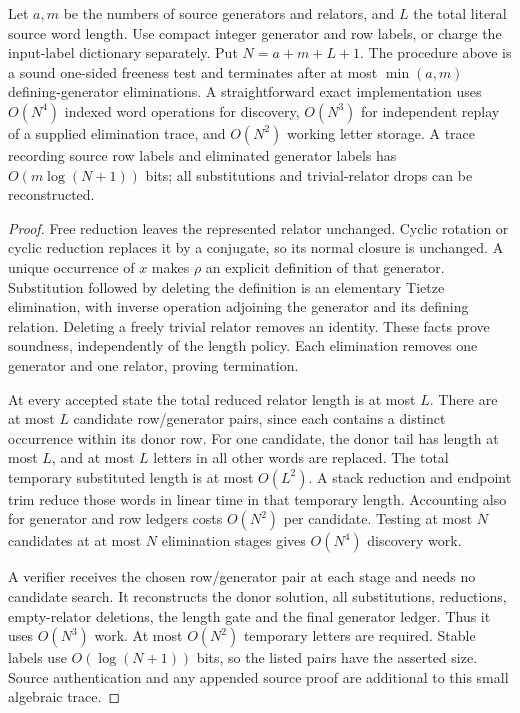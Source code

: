\begin{theorem}
\label{thm:bounded-tietze}
Let $a,m$ be the numbers of source generators and relators, and $L$ the
total literal source word length.  Use compact integer generator and row
labels, or charge the input-label dictionary separately.  Put
$N=a+m+L+1$.  The procedure above
is a sound one-sided freeness test and terminates after at most
$\min(a,m)$ defining-generator eliminations.  A straightforward exact
implementation uses $O(N^4)$ indexed word operations for discovery,
$O(N^3)$ for independent replay of a supplied elimination trace, and
$O(N^2)$ working letter storage.  A trace recording source row labels
and eliminated generator labels has $O(m\log(N+1))$ bits; all
substitutions and trivial-relator drops can be reconstructed.
\end{theorem}
\begin{proof}
Free reduction leaves the represented relator unchanged.  Cyclic rotation
or cyclic reduction replaces it by a conjugate, so its normal closure is
unchanged.  A unique occurrence of $x$ makes $\rho$ an explicit
definition of that generator.  Substitution followed by deleting the
definition is an elementary Tietze elimination, with inverse operation
adjoining the generator and its defining relation.  Deleting a freely
trivial relator removes an identity.  These facts prove soundness,
independently of the length policy.  Each elimination removes one
generator and one relator, proving termination.

At every accepted state the total reduced relator length is at most $L$.
There are at most $L$ candidate row/generator pairs, since each contains a
distinct occurrence within its donor row.  For one candidate, the donor
tail has length at most $L$, and at most $L$ letters in all other words
are replaced.  The total temporary substituted length is at most
$O(L^2)$.  A stack reduction and endpoint trim reduce those words in
linear time in that temporary length.  Accounting also for generator and
row ledgers costs $O(N^2)$ per candidate.  Testing at most $N$ candidates
at at most $N$ elimination stages gives $O(N^4)$ discovery work.

A verifier receives the chosen row/generator pair at each stage and
needs no candidate search.  It reconstructs the donor solution, all
substitutions, reductions, empty-relator deletions, the length gate and
the final generator ledger.  Thus it uses $O(N^3)$ work.  At most
$O(N^2)$ temporary letters are required.  Stable labels use
$O(\log(N+1))$ bits, so the listed pairs have the asserted size.  Source
authentication and any appended source proof are additional to this
small algebraic trace.
\end{proof}


